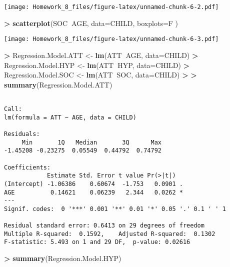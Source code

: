 \documentclass[]{article}
\newenvironment{Shaded}{\begin{snugshade}}{\end{snugshade}}
\newcommand{\KeywordTok}[1]{\textcolor[rgb]{0.13,0.29,0.53}{\textbf{#1}}}
\newcommand{\DataTypeTok}[1]{\textcolor[rgb]{0.13,0.29,0.53}{#1}}
\newcommand{\StringTok}[1]{\textcolor[rgb]{0.31,0.60,0.02}{#1}}
\newcommand{\OperatorTok}[1]{\textcolor[rgb]{0.81,0.36,0.00}{\textbf{#1}}}
\newcommand{\ErrorTok}[1]{\textcolor[rgb]{0.64,0.00,0.00}{\textbf{#1}}}
\newcommand{\NormalTok}[1]{#1}
\begin{document}
\texttt{[image: Homework\_8\_files/figure-latex/unnamed-chunk-6-2.pdf]}

\begin{Shaded}
\begin{Highlighting}[]
\OperatorTok{>}\StringTok{ }\KeywordTok{scatterplot}\NormalTok{(SOC}\OperatorTok{~}\NormalTok{AGE, }\DataTypeTok{data=}\NormalTok{CHILD, }\DataTypeTok{boxplots=}\NormalTok{F )}
\end{Highlighting}
\end{Shaded}

\texttt{[image: Homework\_8\_files/figure-latex/unnamed-chunk-6-3.pdf]}

\begin{Shaded}
\begin{Highlighting}[]
\OperatorTok{>}\StringTok{ }\NormalTok{Regression.Model.ATT <-}\StringTok{ }\KeywordTok{lm}\NormalTok{(ATT}\OperatorTok{~}\NormalTok{AGE, }\DataTypeTok{data=}\NormalTok{CHILD)}
\OperatorTok{>}\StringTok{ }\NormalTok{Regression.Model.HYP <-}\StringTok{ }\KeywordTok{lm}\NormalTok{(ATT}\OperatorTok{~}\NormalTok{HYP, }\DataTypeTok{data=}\NormalTok{CHILD)}
\OperatorTok{>}\StringTok{ }\NormalTok{Regression.Model.SOC <-}\StringTok{ }\KeywordTok{lm}\NormalTok{(ATT}\OperatorTok{~}\NormalTok{SOC, }\DataTypeTok{data=}\NormalTok{CHILD)}
\OperatorTok{>}\StringTok{ }
\ErrorTok{>}\StringTok{ }\KeywordTok{summary}\NormalTok{(Regression.Model.ATT)}
\end{Highlighting}
\end{Shaded}

\begin{verbatim}

Call:
lm(formula = ATT ~ AGE, data = CHILD)

Residuals:
     Min       1Q   Median       3Q      Max 
-1.45208 -0.23275  0.05549  0.44792  0.74792 

Coefficients:
            Estimate Std. Error t value Pr(>|t|)  
(Intercept) -1.06386    0.60674  -1.753   0.0901 .
AGE          0.14621    0.06239   2.344   0.0262 *
---
Signif. codes:  0 '***' 0.001 '**' 0.01 '*' 0.05 '.' 0.1 ' ' 1

Residual standard error: 0.6413 on 29 degrees of freedom
Multiple R-squared:  0.1592,    Adjusted R-squared:  0.1302 
F-statistic: 5.493 on 1 and 29 DF,  p-value: 0.02616
\end{verbatim}

\begin{Shaded}
\begin{Highlighting}[]
\OperatorTok{>}\StringTok{ }\KeywordTok{summary}\NormalTok{(Regression.Model.HYP)}
\end{Highlighting}
\end{Shaded}
\end{document}
